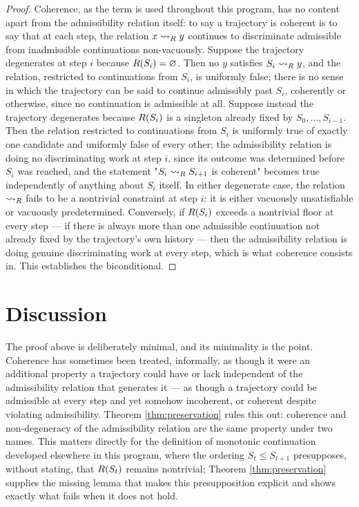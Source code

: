 \begin{proof}
Coherence, as the term is used throughout this program, has no content
apart from the admissibility relation itself: to say a trajectory is
coherent is to say that at each step, the relation $x \rightsquigarrow_{R} y$
continues to discriminate admissible from inadmissible continuations
non-vacuously. Suppose the trajectory degenerates at step $i$ because
$R(S_i) = \varnothing$. Then no $y$ satisfies $S_i \rightsquigarrow_{R} y$, and
the relation, restricted to continuations from $S_i$, is uniformly
false; there is no sense in which the trajectory can be said to continue
admissibly past $S_i$, coherently or otherwise, since no continuation is
admissible at all. Suppose instead the trajectory degenerates because
$R(S_i)$ is a singleton already fixed by $S_0, \dots, S_{i-1}$.
Then the relation restricted to continuations from $S_i$ is uniformly
true of exactly one candidate and uniformly false of every other; the
admissibility relation is doing no discriminating work at step $i$, since
its outcome was determined before $S_i$ was reached, and the statement
"$S_i \rightsquigarrow_{R} S_{i+1}$ is coherent" becomes true independently of
anything about $S_i$ itself. In either degenerate case, the relation
$\rightsquigarrow_{R}$ fails to be a nontrivial constraint at step $i$: it is either
vacuously unsatisfiable or vacuously predetermined. Conversely, if
$R(S_i)$ exceeds a nontrivial floor at every step --- if there is
always more than one admissible continuation not already fixed by the
trajectory's own history --- then the admissibility relation is doing
genuine discriminating work at every step, which is what coherence
consists in. This establishes the biconditional.
\end{proof}

\section{Discussion}

The proof above is deliberately minimal, and its minimality is the
point. Coherence has sometimes been treated, informally, as though it
were an additional property a trajectory could have or lack independent
of the admissibility relation that generates it --- as though a
trajectory could be admissible at every step and yet somehow
incoherent, or coherent despite violating admissibility. Theorem
\ref{thm:preservation} rules this out: coherence and non-degeneracy of
the admissibility relation are the same property under two names. This
matters directly for the definition of monotonic continuation developed
elsewhere in this program, where the ordering $S_t \le S_{t+1}$
presupposes, without stating, that $R(S_t)$ remains nontrivial;
Theorem \ref{thm:preservation} supplies the missing lemma that makes
this presupposition explicit and shows exactly what fails when it does
not hold.

